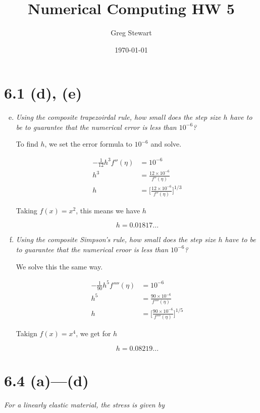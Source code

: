 \documentclass{article}
\title{Numerical Computing HW 5}
\author{Greg Stewart}
\date{\today}
\begin{document}
\maketitle

\section*{6.1 (d), (e)}

\begin{enumerate}[(a)]\setcounter{enumi}{4}
  \item \textit{Using the composite trapezoirdal rule, how small does the step size $h$ have to be to guarantee that the numerical error is less than $10^{-6}$?}

    To find $h$, we set the error formula to $10^{-6}$ and solve.

    \begin{align*}
      -\frac{1}{12}h^3f''(\eta) &= 10^{-6} \\
      h^3 &= \frac{12 \times 10^{-6}}{f''(\eta)} \\
      h &= \Big[\frac{12 \times 10^{-6}}{f''(\eta)}\Big]^{1/3} 
    \end{align*}

    Taking $f(x) = x^2$, this means we have $h$

    $$h = 0.01817...$$
  \item \textit{Using the composite Simpson's rule, how small does the step size $h$ have to be to guarantee that the numerical eroor is less than $10^{-6}$?}

    We solve this the same way.

    \begin{align*}
      -\frac{1}{90}h^5f''''(\eta) &= 10^{-6} \\
      h^5 &= \frac{90 \times 10^{-6}}{f''''(\eta)} \\
      h &= \Big[\frac{90 \times 10^{-6}}{f''''(\eta)}\Big]^{1/5}
    \end{align*}

    Takign $f(x) = x^4$, we get for $h$

    $$h = 0.08219...$$ 
\end{enumerate}


\section*{6.4 (a)---(d)}

\textit{For a linearly elastic material, the stress is given by}
\end{document}
